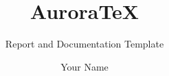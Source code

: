 \documentclass{AuroraTeX}
\title{AuroraTeX}
\subtitle{Report and Documentation Template}
\author{Your Name}
\date{}
\begin{document}
\maketitle

\tableofcontents
\clearpage




\clearpage
\nocite{auroratex,pgfplots}


\end{document}
